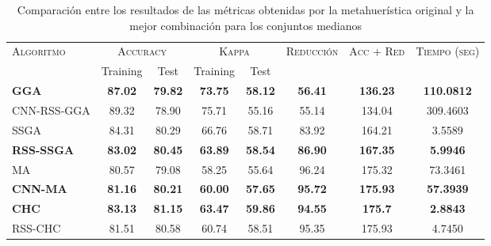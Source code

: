 \begin{table}[h!]
\centering
\begin{adjustbox}{max width =\textwidth}
\begin{tabular}{l c c c c c c c}
\hline
\multirow{2}{*}{\textsc{Algoritmo}}
	& \multicolumn{2}{c}{\textsc{Accuracy}}
	& \multicolumn{2}{c}{\textsc{Kappa}}
	& \textsc{Reducción}
	& \textsc{Acc + Red}
	& \textsc{Tiempo (seg)} \\
	& Training & Test
	& Training & Test \\ 
\hline
\hline

\textbf{GGA}  & \textbf{87.02} & \textbf{79.82} & \textbf{73.75} & \textbf{58.12} & \textbf{56.41} & \textbf{136.23} & \textbf{110.0812} \\
CNN-RSS-GGA & 89.32 & 78.90 & 75.71 & 55.16 & 55.14 & 134.04 & 309.4603 \\

\hline

SSGA & 84.31 & 80.29 & 66.76 & 58.71 & 83.92 & 164.21 & 3.5589 \\
\textbf{RSS-SSGA} & \textbf{83.02} & \textbf{80.45} & \textbf{63.89} & \textbf{58.54} & \textbf{86.90} & \textbf{167.35} & \textbf{5.9946} \\

\hline

MA   & 80.57 & 79.08 & 58.25 & 55.64 & 96.24 & 175.32 & 73.3461 \\
\textbf{CNN-MA} & \textbf{81.16} & \textbf{80.21} & \textbf{60.00} & \textbf{57.65} & \textbf{95.72} & \textbf{175.93} & \textbf{57.3939} \\

\hline

\textbf{CHC}  & \textbf{83.13} & \textbf{81.15} & \textbf{63.47} & \textbf{59.86} & \textbf{94.55} & \textbf{175.7}  & \textbf{2.8843} \\
RSS-CHC & 81.51 & 80.58 & 60.74 & 58.51 & 95.35 & 175.93 & 4.7450 \\

\hline
\end{tabular}
\end{adjustbox}
\caption{Comparación entre los resultados de las métricas obtenidas por la metahuerística original y la mejor combinación para los conjuntos medianos}
\label{med-best-all}

\end{table}

